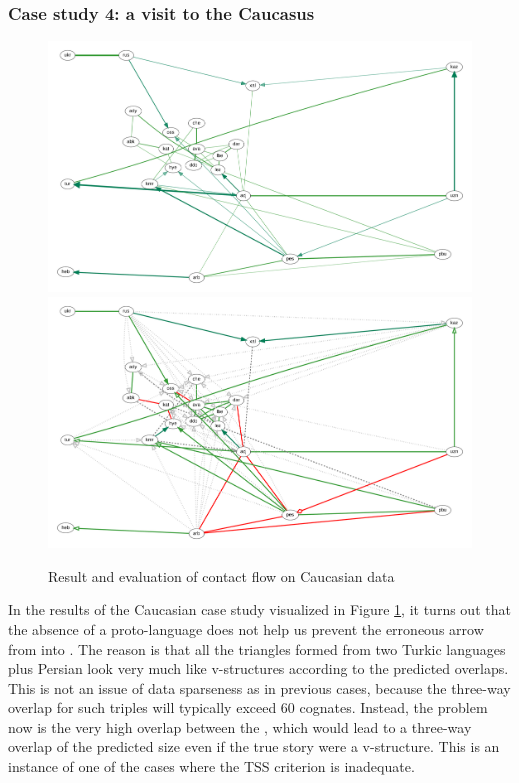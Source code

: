  \subsubsection{Case study 4: a visit to the Caucasus}
 \begin{figure}
 \includegraphics[width=\textwidth]{figures/caucasus-contact-fs-tss.pdf}
 \vspace*{5mm}
 \includegraphics[width=\textwidth]{figures/caucasus-contact-fs-tss-eval.pdf}
 \caption{Result and evaluation of contact flow on Caucasian data}
 \label{caucasus-result-contact}
 \end{figure}
 
 In the results of the Caucasian case study visualized in Figure \ref{caucasus-result-contact}, it turns out that the absence of a proto-language does not help us prevent the erroneous arrow from  into . The reason is that all the triangles formed from two Turkic languages plus Persian look very much like v-structures according to the predicted overlaps. This is not an issue of data sparseness as in previous cases, because the three-way overlap for such triples will typically exceed 60 cognates. Instead, the problem now is the very high overlap between the , which would lead to a three-way overlap of the predicted size even if the true story were a v-structure. This is an instance of one of the cases where the TSS criterion is inadequate.
 
